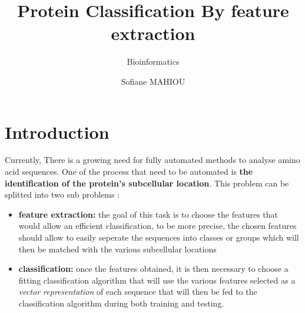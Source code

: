 \documentclass{bioinfo}
\begin{document}
 

\subtitle{Bioinformatics}

\title[Bio-informatics Assignment]{Protein Classification By feature extraction}
\author[Bio-informatics Assignment]{Sofiane MAHIOU}
\address{Computer Science, UCL, London, WC1E 6BT, UK}

\corresp{}

\history{}

\editor{}


\maketitle

\section{Introduction}

Currently, There is a growing need for fully automated methods to analyse amino acid sequences. One of the process that need to be automated is \textbf{the identification of the protein's subcellular location}. This problem can be splitted into two sub problems :\\
\begin{itemize}
	\item \textbf{feature extraction: } the goal of this task is to choose the features that would allow an efficient classification, to be more precise, the chosen features should allow to easily seperate the sequences into classes or groups which will then be matched with the various subcellular locations 
	\item \textbf{classification: } once the features obtained, it is then necessary to choose a fitting classification algorithm that will use the various features selected as a \textit{vector representation} of each sequence that will then be fed to the classification algorithm during both training and testing.
\end{itemize}
\end{document}
